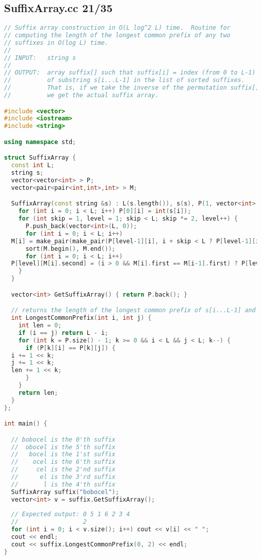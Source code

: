 \subsection{SuffixArray.cc 21/35}
\begin{lstlisting}[language=C++]
// Suffix array construction in O(L log^2 L) time.  Routine for
// computing the length of the longest common prefix of any two
// suffixes in O(log L) time.
//
// INPUT:   string s
//
// OUTPUT:  array suffix[] such that suffix[i] = index (from 0 to L-1)
//          of substring s[i...L-1] in the list of sorted suffixes.
//          That is, if we take the inverse of the permutation suffix[],
//          we get the actual suffix array.

#include <vector>
#include <iostream>
#include <string>

using namespace std;

struct SuffixArray {
  const int L;
  string s;
  vector<vector<int> > P;
  vector<pair<pair<int,int>,int> > M;

  SuffixArray(const string &s) : L(s.length()), s(s), P(1, vector<int>(L, 0)), M(L) {
    for (int i = 0; i < L; i++) P[0][i] = int(s[i]);
    for (int skip = 1, level = 1; skip < L; skip *= 2, level++) {
      P.push_back(vector<int>(L, 0));
      for (int i = 0; i < L; i++) 
  M[i] = make_pair(make_pair(P[level-1][i], i + skip < L ? P[level-1][i + skip] : -1000), i);
      sort(M.begin(), M.end());
      for (int i = 0; i < L; i++) 
  P[level][M[i].second] = (i > 0 && M[i].first == M[i-1].first) ? P[level][M[i-1].second] : i;
    }    
  }

  vector<int> GetSuffixArray() { return P.back(); }

  // returns the length of the longest common prefix of s[i...L-1] and s[j...L-1]
  int LongestCommonPrefix(int i, int j) {
    int len = 0;
    if (i == j) return L - i;
    for (int k = P.size() - 1; k >= 0 && i < L && j < L; k--) {
      if (P[k][i] == P[k][j]) {
  i += 1 << k;
  j += 1 << k;
  len += 1 << k;
      }
    }
    return len;
  }
};

int main() {

  // bobocel is the 0'th suffix
  //  obocel is the 5'th suffix
  //   bocel is the 1'st suffix
  //    ocel is the 6'th suffix
  //     cel is the 2'nd suffix
  //      el is the 3'rd suffix
  //       l is the 4'th suffix
  SuffixArray suffix("bobocel");
  vector<int> v = suffix.GetSuffixArray();
  
  // Expected output: 0 5 1 6 2 3 4
  //                  2
  for (int i = 0; i < v.size(); i++) cout << v[i] << " ";
  cout << endl;
  cout << suffix.LongestCommonPrefix(0, 2) << endl;
}

\end{lstlisting}

